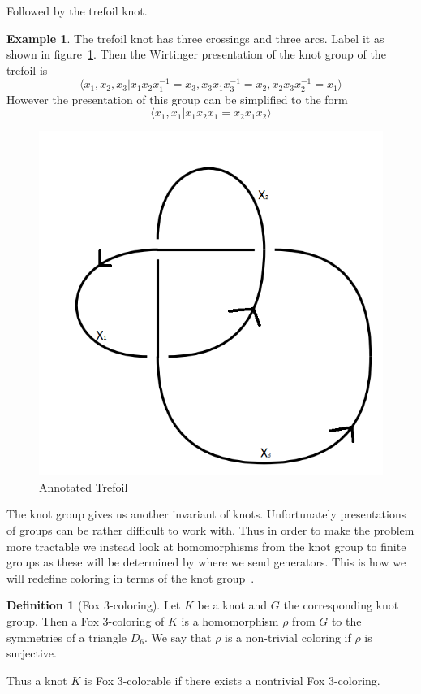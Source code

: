 \documentclass[12pt]{amsart}
\theoremstyle{definition}
\newtheorem{definition}[theorem]{Definition}
\newtheorem{example}[theorem]{Example}
\theoremstyle{remark}
\numberwithin{equation}{section}
\newcommand{\ds}{.3}
\begin{document}
Followed by the trefoil knot.

\begin{example}
  The trefoil knot has three crossings and three arcs. Label it as
  shown in figure~\ref{fig:annotated-trefoil}. Then the Wirtinger presentation
  of the knot group of the trefoil is
  \[
    \langle x_1,x_2,x_3|x_1x_2x_1^{-1}=x_3,x_3x_1x_3^{-1}=x_2,x_2x_3x_2^{-1}=x_1\rangle
  \]
  However the presentation of this group can be simplified to the
  form
  \[
    \langle x_1,x_1| x_1x_2x_1=x_2x_1x_2\rangle
  \]
\end{example}

\begin{figure}
  \includegraphics[scale=\ds]{annotated-trefoil}
  \caption{Annotated Trefoil}
  \label{fig:annotated-trefoil}
\end{figure}

The knot group gives us another invariant of knots. Unfortunately
presentations of groups can be rather difficult to work with.
Thus in order to make the problem more tractable we instead look
at homomorphisms from the knot group to finite groups as these
will be determined by where we send generators. This is
how we will redefine coloring in terms of the knot group~\cite{quickfox}.

\begin{definition}[Fox 3-coloring]
  Let $K$ be a knot and $G$ the corresponding knot group. Then a
  Fox 3-coloring of $K$ is a homomorphism $\rho$ from
  $G$ to the symmetries of a triangle $D_6$. We say that
  $\rho$ is a non-trivial coloring if $\rho$ is surjective.

  Thus a knot $K$ is Fox 3-colorable if there exists a nontrivial
  Fox 3-coloring.
\end{definition}
\end{document}
